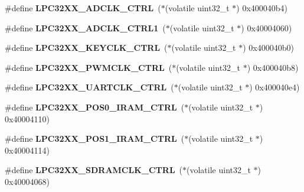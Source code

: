 \begin{DoxyCompactItemize}
\#define {\bfseries L\+P\+C32\+X\+X\+\_\+\+A\+D\+C\+L\+K\+\_\+\+C\+T\+RL}~($\ast$(volatile uint32\+\_\+t $\ast$) 0x400040b4)
\item 
\mbox{\label{group__lpc32xx__reg_ga9771e37a9f28d4ad51279eff27edc77e}} 
\#define {\bfseries L\+P\+C32\+X\+X\+\_\+\+A\+D\+C\+L\+K\+\_\+\+C\+T\+R\+L1}~($\ast$(volatile uint32\+\_\+t $\ast$) 0x40004060)
\item 
\mbox{\label{group__lpc32xx__reg_ga7c6bc0f8ee5df5d2a0fbec07ece654ff}} 
\#define {\bfseries L\+P\+C32\+X\+X\+\_\+\+K\+E\+Y\+C\+L\+K\+\_\+\+C\+T\+RL}~($\ast$(volatile uint32\+\_\+t $\ast$) 0x400040b0)
\item 
\mbox{\label{group__lpc32xx__reg_ga9decc51b7bd92e47d0f7013c03419663}} 
\#define {\bfseries L\+P\+C32\+X\+X\+\_\+\+P\+W\+M\+C\+L\+K\+\_\+\+C\+T\+RL}~($\ast$(volatile uint32\+\_\+t $\ast$) 0x400040b8)
\item 
\mbox{\label{group__lpc32xx__reg_ga2b301e3678307067a536008e1a95cc8d}} 
\#define {\bfseries L\+P\+C32\+X\+X\+\_\+\+U\+A\+R\+T\+C\+L\+K\+\_\+\+C\+T\+RL}~($\ast$(volatile uint32\+\_\+t $\ast$) 0x400040e4)
\item 
\mbox{\label{group__lpc32xx__reg_ga48affaf19a8167b961360d44345bf51c}} 
\#define {\bfseries L\+P\+C32\+X\+X\+\_\+\+P\+O\+S0\+\_\+\+I\+R\+A\+M\+\_\+\+C\+T\+RL}~($\ast$(volatile uint32\+\_\+t $\ast$) 0x40004110)
\item 
\mbox{\label{group__lpc32xx__reg_ga51ad09497f30f7c0e30a383c39599058}} 
\#define {\bfseries L\+P\+C32\+X\+X\+\_\+\+P\+O\+S1\+\_\+\+I\+R\+A\+M\+\_\+\+C\+T\+RL}~($\ast$(volatile uint32\+\_\+t $\ast$) 0x40004114)
\item 
\mbox{\label{group__lpc32xx__reg_ga23a6b42e21b52bd80ceb971236f8401e}} 
\#define {\bfseries L\+P\+C32\+X\+X\+\_\+\+S\+D\+R\+A\+M\+C\+L\+K\+\_\+\+C\+T\+RL}~($\ast$(volatile uint32\+\_\+t $\ast$) 0x40004068)
\end{DoxyCompactItemize}
